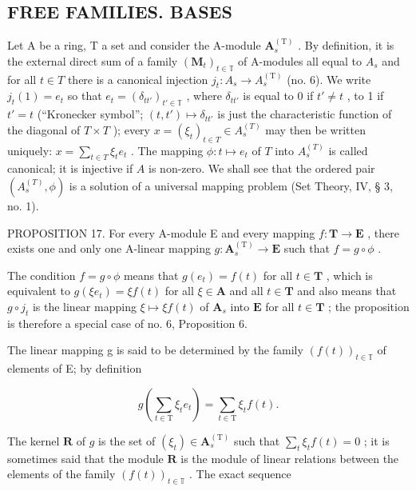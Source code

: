 \subsection{FREE FAMILIES. BASES}

Let A be a ring, T a set and consider the A-module \(\mathbf{A}_{s}^{\mathrm{(T)}}\) . By definition, it is the external direct sum of a family \((\mathbf{M}_{t})_{t\in\mathbb{T}}\) of A-modules all equal to \(A_{s}\) and for all \(t\in T\) there is a canonical injection \(j_{t}:A_{s}\to A_{s}^{\mathrm{(T)}}\) (no. 6). We write \(j_{t}(1) = e_{t}\) so that \(e_{t} = (\delta_{tt'})_{t' \in \mathbb{T}}\) , where \(\delta_{tt'}\) is equal to 0 if \(t' \neq t\) , to 1 if \(t' = t\) (``Kronecker symbol''; \((t, t') \mapsto \delta_{tt'}\) is just the characteristic function of the diagonal of \(T \times T\) ); every \(x = (\xi_{t})_{t \in T} \in A_{s}^{(T)}\) may then be written uniquely: \(x = \sum_{t \in T} \xi_{t} e_{t}\) . The mapping \(\phi: t \mapsto e_{t}\) of \(T\) into \(A_{s}^{(T)}\) is called canonical; it is injective if \(A\) is non-zero. We shall see that the ordered pair \((A_{s}^{(T)}, \phi)\) is a solution of a universal mapping problem (Set Theory, IV, § 3, no. 1).

PROPOSITION 17. For every A-module E and every mapping \(f: \mathbf{T} \to \mathbf{E}\) , there exists one and only one A-linear mapping \(g: \mathbf{A}_{s}^{(\mathrm{T})} \to \mathbf{E}\) such that \(f = g \circ \phi\) .

The condition \(f = g \circ \phi\) means that \(g(e_t) = f(t)\) for all \(t \in \mathbf{T}\) , which is equivalent to \(g(\xi e_t) = \xi f(t)\) for all \(\xi \in \mathbf{A}\) and all \(t \in \mathbf{T}\) and also means that \(g \circ j_t\) is the linear mapping \(\xi \mapsto \xi f(t)\) of \(\mathbf{A}_s\) into \(\mathbf{E}\) for all \(t \in \mathbf{T}\) ; the proposition is therefore a special case of no. 6, Proposition 6.

The linear mapping g is said to be determined by the family \((f(t))_{t\in\mathbb{T}}\) of elements of E; by definition

\[
g \left(\sum_ {t \in \mathrm{T}} \xi_ {t} e _ {t}\right) = \sum_ {t \in \mathrm{T}} \xi_ {t} f (t).\tag{43}
\]

The kernel \(\mathbf{R}\) of \(g\) is the set of \((\xi_t) \in \mathbf{A}_s^{(\mathrm{T})}\) such that \(\sum_{t} \xi_t f(t) = 0\) ; it is sometimes said that the module \(\mathbf{R}\) is the module of linear relations between the elements of the family \((f(t))_{t \in \mathbb{T}}\) . The exact sequence

